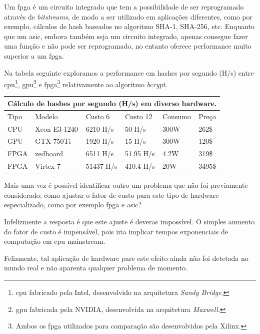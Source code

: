 Um \gls{fpga} é um circuito integrado que tem a possibilidade de ser reprogramado através de \emph{bitstreams}, de modo a ser utilizado em aplicações diferentes, como por exemplo, cálculos de hash baseados no algoritmo SHA-1, SHA-256, etc. Enquanto que um \gls{asic}, embora também seja um circuito integrado, apenas consegue fazer uma função e não pode ser reprogramado, no entanto oferece performance muito superior a um \gls{fpga}.

Na tabela seguinte exploramos a performance em hashes por segundo (H/s) entre \gls{cpu}\footnote{\gls{cpu} fabricado pela Intel, desenvolvido na arquitetura \emph{Sandy Bridge}.}, \gls{gpu}\footnote{\gls{gpu} fabricada pela NVIDIA, desenvolvida na arquitetura \emph{Maxwell}.} e \gls{fpga}\footnote{Ambos os \gls{fpga} utilizados para comparação são desenvolvidos pela Xilinx.} relativamente ao algoritmo \emph{bcrypt}.

\begin{center}
    \begin{tabular}{ |p{1cm}|p{2.5cm}|p{2cm}|p{2cm}|p{1.75cm}|p{0.9cm}|  }
        \hline
        \multicolumn{6}{|c|}{Cálculo de hashes por segundo (H/s) em diverso hardware.} \\
        \hline
        Tipo & Modelo & Custo 6 & Custo 12 & Consumo & Preço\\
        \hline
        CPU & Xeon E3-1240 & 6210 H/s & 50 H/s& 300W & 262\$\\
        GPU & GTX 750Ti & 1920 H/s& 15 H/s& 300W & 120\$\\
        FPGA & zedboard & 6511 H/s & 51.95 H/s& 4.2W & 319\$\\
        FPGA & Virtex-7 & 51437 H/s& 410.4 H/s& 20W & 3495\$\\
        \hline
    \end{tabular}
\label{tab:bcrypt_hashrate} 
\end{center}

Mais uma vez é possível identificar outro um problema que não foi previamente considerado: como ajustar o fator de custo para este tipo de hardware especializado, como por exemplo \gls{fpga} e \gls{asic}?

Infelizmente a resposta é que este ajuste é deveras impossível. O simples aumento do fator de custo é impensável, pois iria implicar tempos exponenciais de computação em \gls{cpu} mainstream.

Felizmente, tal aplicação de hardware pare este efeito ainda não foi detetada no mundo real e não aparenta qualquer problema de momento.

